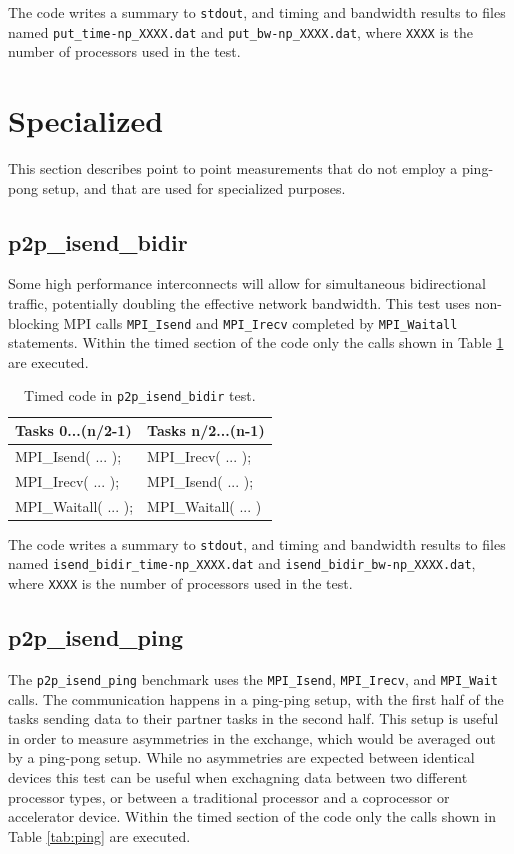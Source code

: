 \documentclass[10pt,a4paper]{report}
\begin{document}
The code writes a summary to \verb+stdout+, and timing and bandwidth results to files named \verb+put_time-np_XXXX.dat+ and \verb+put_bw-np_XXXX.dat+, where \verb+XXXX+ is the number of processors used in the test.

\section{Specialized}
This section describes point to point measurements that do not employ a ping-pong setup, and that are used for specialized purposes.

\FloatBarrier
\subsection{p2p\_isend\_bidir}
Some high performance interconnects will allow for simultaneous bidirectional traffic, potentially doubling the effective network bandwidth. This test uses non-blocking MPI calls \verb+MPI_Isend+ and \verb+MPI_Irecv+ completed by \verb+MPI_Waitall+ statements. 
Within the timed section of the code only the calls shown in Table \ref{tab:bidir} are executed.

\begin{table}[ht]
\centering
\caption{Timed code in \texttt{p2p\_isend\_bidir} test.}
\label{tab:bidir}
\begin{tabular}{|l|l|}
\hline
\bf{Tasks 0...(n/2-1)}	& \bf{Tasks n/2...(n-1)}\\\hline
MPI\_Isend( ... );      & MPI\_Irecv( ... );\\
MPI\_Irecv( ... );      & MPI\_Isend( ... );\\
MPI\_Waitall( ... );    & MPI\_Waitall( ... )\\\hline
\end{tabular}
\end{table}

The code writes a summary to \verb+stdout+, and timing and bandwidth results to files named \verb+isend_bidir_time-np_XXXX.dat+ and \verb+isend_bidir_bw-np_XXXX.dat+, where \verb+XXXX+ is the number of processors used in the test.

\FloatBarrier
\subsection{p2p\_isend\_ping}
The \verb+p2p_isend_ping+ benchmark uses the \verb+MPI_Isend+, \verb+MPI_Irecv+, and \verb+MPI_Wait+ calls. The communication happens in a ping-ping setup, with the first half of the tasks sending data to their partner tasks in the second half. This setup is useful in order to measure asymmetries in the exchange, which would be averaged out by a ping-pong setup. While no asymmetries are expected between identical devices this test can be useful when exchagning data between two different processor types, or between a traditional processor and a coprocessor or accelerator device. Within the timed section of the code only the calls shown in Table \ref{tab:ping} are executed.
\end{document}
